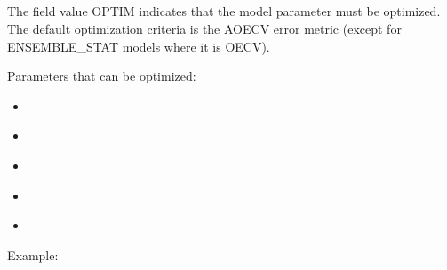 \documentclass[letterpaper,10pt,english]{sphinxmanual}
\begin{document}
\subsection{}
\label{\detokenize{SgteLib:optim}}\label{\detokenize{SgteLib:id28}}
\begin{DUlineblock}{0em}
\item[] The field value OPTIM indicates that the model parameter must be optimized. The default optimization criteria is the AOECV error metric (except for ENSEMBLE\_STAT models where it is OECV).
\item[] Parameters that can be optimized:
\end{DUlineblock}
\begin{itemize}
\item {} 
\sphinxAtStartPar
{\hyperref[\detokenize{SgteLib:degree}]{}}

\item {} 
\sphinxAtStartPar
{\hyperref[\detokenize{SgteLib:ridge}]{}}

\item {} 
\sphinxAtStartPar
{\hyperref[\detokenize{SgteLib:kernel-type}]{}}

\item {} 
\sphinxAtStartPar
{\hyperref[\detokenize{SgteLib:kernel-shape}]{}}

\item {} 
\sphinxAtStartPar
{\hyperref[\detokenize{SgteLib:distance-type}]{}}

\end{itemize}

\begin{DUlineblock}{0em}
\item[] Example:
\item[] 
\item[] 
\end{DUlineblock}
\end{document}
